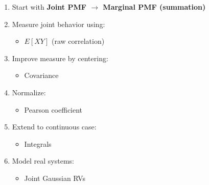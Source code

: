 \documentclass[12pt]{article}
\begin{document}
\begin{enumerate}
    \item Start with \textbf{Joint PMF $\rightarrow$ Marginal PMF (summation)}
    \item Measure joint behavior using:
    \begin{itemize}
        \item $E[XY]$ (raw correlation)
    \end{itemize}
    \item Improve measure by centering:
    \begin{itemize}
        \item Covariance
    \end{itemize}
    \item Normalize:
    \begin{itemize}
        \item Pearson coefficient
    \end{itemize}
    \item Extend to continuous case:
    \begin{itemize}
        \item Integrals
    \end{itemize}
    \item Model real systems:
    \begin{itemize}
        \item Joint Gaussian RVs
    \end{itemize}
\end{enumerate}
\end{document}
